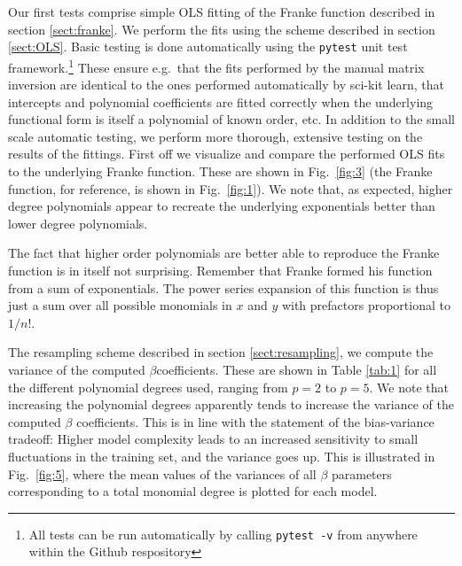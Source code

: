 \documentclass[a4paper, twocolumn]{article}
\newcommand{\fig}[1]{Fig.\ \ref{fig:#1}}
\newcommand{\tab}[1]{Table \ref{tab:#1}}
\begin{document}
Our first tests comprise simple OLS fitting of the Franke function described in section \ref{sect:franke}. We perform the fits using the scheme described in section \ref{sect:OLS}. Basic testing is done automatically using the \texttt{pytest} unit test framework.\footnote{All tests can be run automatically by calling \texttt{pytest -v} from anywhere within the Github respository} These ensure e.g.\ that the fits performed by the manual matrix inversion are identical to the ones performed automatically by sci-kit learn, that intercepts and polynomial coefficients are fitted correctly when the underlying functional form is itself a polynomial of known order, etc. In addition to the small scale automatic testing, we perform more thorough, extensive testing on the results of the fittings. First off we visualize and compare the performed OLS fits to the underlying Franke function. These are shown in \fig{3} (the Franke function, for reference, is shown in \fig{1}). We note that, as expected, higher degree polynomials appear to recreate the underlying exponentials better than lower degree polynomials. 

The fact that higher order polynomials are better able to reproduce the Franke function is in itself not surprising. Remember that Franke formed his function from a sum of exponentials. The power series expansion of this function is thus just a sum over all possible monomials in $x$ and $y$ with prefactors proportional to $1/n!$. 

The resampling scheme described in section \ref{sect:resampling}, we compute the variance of the computed $\beta$coefficients. These are shown in \tab{1} for all the different polynomial degrees used, ranging from $p=2$ to $p=5$. We note that increasing the polynomial degrees apparently tends to increase the variance of the computed $\beta$ coefficients. This is in line with the statement of the bias-variance tradeoff: Higher model complexity leads to an increased sensitivity to small fluctuations in the training set, and the variance goes up. This is illustrated in \fig{5}, where the mean values of the variances of all $\beta$ parameters corresponding to a total monomial degree is plotted for each model. 
\end{document}
